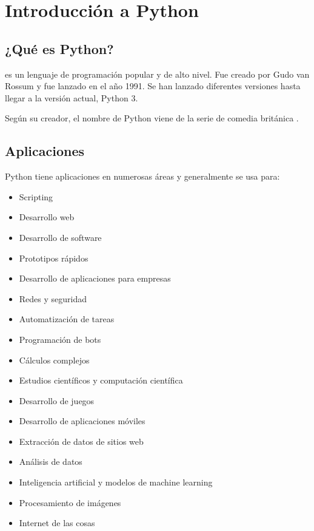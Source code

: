\chapter{Introducción a Python}

\section{¿Qué es Python?}

 es un lenguaje de programación popular y de alto nivel. Fue creado por Gudo van Rossum y fue lanzado en el año 1991. Se han lanzado diferentes versiones hasta llegar a la versión actual, Python 3.\smallskip

Según su creador, el nombre de Python viene de la serie de comedia británica .

\section{Aplicaciones}

Python tiene aplicaciones en numerosas áreas y generalmente se usa para:

\begin{itemize}
  \item Scripting
  
  \item Desarrollo web
  
  \item Desarrollo de software
  
  \item Prototipos rápidos
  
  \item Desarrollo de aplicaciones para empresas

  \item Redes y seguridad

  \item Automatización de tareas
  
  \item Programación de bots

  \item Cálculos complejos

  \item Estudios científicos y computación científica
  
  \item Desarrollo de juegos
  
  \item Desarrollo de aplicaciones móviles

  \item Extracción de datos de sitios web

  \item Análisis de datos

  \item Inteligencia artificial y modelos de machine learning

  \item Procesamiento de imágenes

  \item Internet de las cosas
  
\end{itemize}

